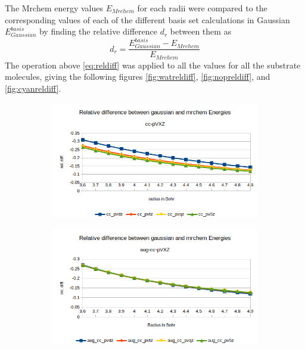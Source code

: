 \documentclass[../master_thesis.tex]{subfiles}
\begin{document}
The Mrchem energy values $E_{Mrchem}$ for each radii were compared to the
corresponding values of each of the different basis set calculations in
Gaussian  $E_{Gaussian}^{basis}$ by finding the relative difference $d_r$
between them as
\begin{equation}\label{eq:reldiff}
  d_r = \frac{E_{Gaussian}^{basis} - E_{Mrchem}}{E_{Mrchem}}
\end{equation}
The operation above \ref{eq:reldiff} was applied to all the values for all the
substrate molecules, giving the following figures \ref{fig:watreldiff},
\ref{fig:nopreldiff}, and \ref{fig:cyanreldiff}.

\begin{figure}[h!]
  \centering
  \begin{subfigure}[b]{\linewidth}
    \includegraphics[width=\linewidth]{img/watreldiff.png}
  \end{subfigure}
  \begin{subfigure}[b]{\linewidth}
    \includegraphics[width=\linewidth]{img/wataugreldiff.png}
  \end{subfigure}
  \begin{subfigure}[b]{\linewidth}

\end{subfigure}
\end{figure}
\end{document}
